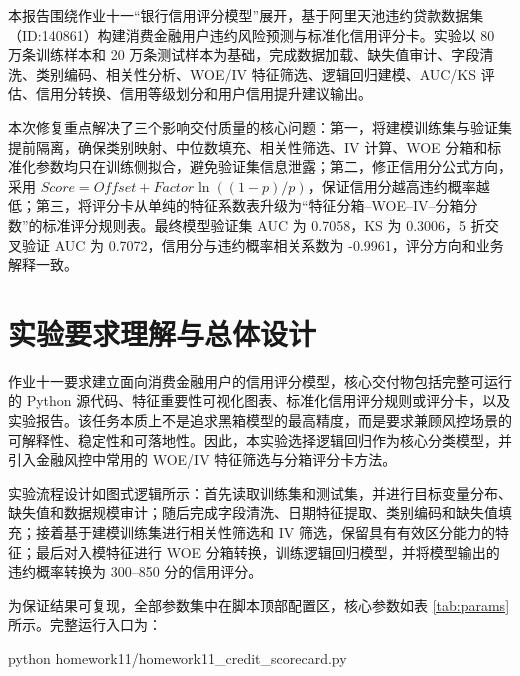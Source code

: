 \documentclass[UTF8,a4paper,12pt]{ctexart}
\author{丁致宇}
\date{2026年6月}
\begin{document}
\maketitle

\begin{ustcabstract}
本报告围绕作业十一“银行信用评分模型”展开，基于阿里天池违约贷款数据集（ID:140861）构建消费金融用户违约风险预测与标准化信用评分卡。实验以 80 万条训练样本和 20 万条测试样本为基础，完成数据加载、缺失值审计、字段清洗、类别编码、相关性分析、WOE/IV 特征筛选、逻辑回归建模、AUC/KS 评估、信用分转换、信用等级划分和用户信用提升建议输出。

本次修复重点解决了三个影响交付质量的核心问题：第一，将建模训练集与验证集提前隔离，确保类别映射、中位数填充、相关性筛选、IV 计算、WOE 分箱和标准化参数均只在训练侧拟合，避免验证集信息泄露；第二，修正信用分公式方向，采用 $Score=Offset+Factor\ln((1-p)/p)$，保证信用分越高违约概率越低；第三，将评分卡从单纯的特征系数表升级为“特征分箱--WOE--IV--分箱分数”的标准评分规则表。最终模型验证集 AUC 为 0.7058，KS 为 0.3006，5 折交叉验证 AUC 为 0.7072，信用分与违约概率相关系数为 -0.9961，评分方向和业务解释一致。
\end{ustcabstract}

\clearpage
\tableofcontents
\clearpage

\section{实验要求理解与总体设计}

作业十一要求建立面向消费金融用户的信用评分模型，核心交付物包括完整可运行的 Python 源代码、特征重要性可视化图表、标准化信用评分规则或评分卡，以及实验报告。该任务本质上不是追求黑箱模型的最高精度，而是要求兼顾风控场景的可解释性、稳定性和可落地性。因此，本实验选择逻辑回归作为核心分类模型，并引入金融风控中常用的 WOE/IV 特征筛选与分箱评分卡方法。

实验流程设计如图式逻辑所示：首先读取训练集和测试集，并进行目标变量分布、缺失值和数据规模审计；随后完成字段清洗、日期特征提取、类别编码和缺失值填充；接着基于建模训练集进行相关性筛选和 IV 筛选，保留具有有效区分能力的特征；最后对入模特征进行 WOE 分箱转换，训练逻辑回归模型，并将模型输出的违约概率转换为 300--850 分的信用评分。

为保证结果可复现，全部参数集中在脚本顶部配置区，核心参数如表 \ref{tab:params} 所示。完整运行入口为：

\begin{CodeBlock}
python homework11/homework11_credit_scorecard.py
\end{CodeBlock}
\end{document}

